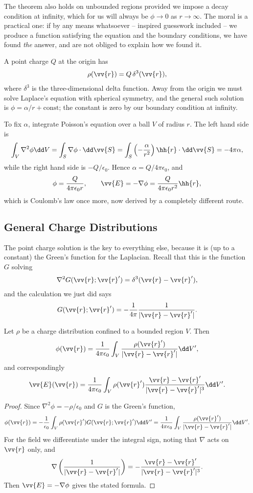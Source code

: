 The theorem also holds on unbounded regions provided we impose a decay condition at infinity, which for us will always be $\phi \to 0$ as $r \to \infty$. The moral is a practical one: if by any means whatsoever -- inspired guesswork included -- we produce a function satisfying the equation and the boundary conditions, we have found \emph{the} answer, and are not obliged to explain how we found it.

\begin{example}
	A point charge $Q$ at the origin has
	$$
	\rho(\vv{r}) = Q\, \delta^3(\vv{r}),
	$$
	where $\delta^3$ is the three-dimensional delta function. Away from the origin we must solve Laplace's equation with spherical symmetry, and the general such solution is $\phi = \alpha/r + \text{const}$; the constant is zero by our boundary condition at infinity.

	To fix $\alpha$, integrate Poisson's equation over a ball $V$ of radius $r$. The left hand side is
	$$
	\int_V \nabla^2 \phi \dd V = \int_S \nabla \phi \cdot \dd \vv{S} = \int_S \left(-\frac{\alpha}{r^2}\right)\hh{r}\cdot \dd \vv{S} = -4\pi \alpha,
	$$
	while the right hand side is $-Q/\epsilon_0$. Hence $\alpha = Q/4\pi\epsilon_0$, and
	$$
	\phi = \frac{Q}{4\pi\epsilon_0 r}, \qquad \vv{E} = -\nabla \phi = \frac{Q}{4\pi \epsilon_0 r^2}\hh{r},
	$$
	which is Coulomb's law once more, now derived by a completely different route.
\end{example}

\subsection{General Charge Distributions}

The point charge solution is the key to everything else, because it is (up to a constant) the Green's function for the Laplacian. Recall that this is the function $G$ solving
$$
\nabla^2 G(\vv{r}; \vv{r}') = \delta^3(\vv{r}-\vv{r}'),
$$
and the calculation we just did says
$$
G(\vv{r}; \vv{r}') = -\frac{1}{4\pi}\frac{1}{|\vv{r}-\vv{r}'|}.
$$

\begin{proposition}
	\label{prop:general-phi}
	Let $\rho$ be a charge distribution confined to a bounded region $V$. Then
	$$
	\phi(\vv{r}) = \frac{1}{4\pi\epsilon_0}\int_V \frac{\rho(\vv{r}')}{|\vv{r}-\vv{r}'|}\dd V',
	$$
	and correspondingly
	$$
	\vv{E}(\vv{r}) = \frac{1}{4\pi \epsilon_0}\int_V \rho(\vv{r}')\frac{\vv{r}-\vv{r}'}{|\vv{r}-\vv{r}'|^3}\dd V'.
	$$
\end{proposition}
\begin{proof}
	Since $\nabla^2 \phi = -\rho/\epsilon_0$ and $G$ is the Green's function,
	$$
	\phi(\vv{r}) = -\frac{1}{\epsilon_0}\int_V \rho(\vv{r}') G(\vv{r};\vv{r}')\dd V' = \frac{1}{4\pi \epsilon_0}\int_V \frac{\rho(\vv{r}')}{|\vv{r}-\vv{r}'|}\dd V'.
	$$
	For the field we differentiate under the integral sign, noting that $\nabla$ acts on $\vv{r}$ only, and
	$$
	\nabla\left(\frac{1}{|\vv{r}-\vv{r}'|}\right) = -\frac{\vv{r}-\vv{r}'}{|\vv{r}-\vv{r}'|^3}.
	$$
	Then $\vv{E} = -\nabla \phi$ gives the stated formula.
\end{proof}

